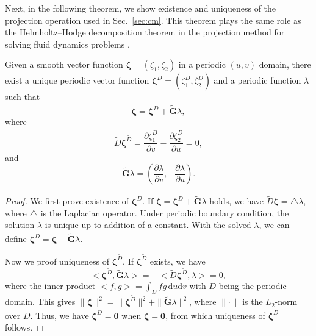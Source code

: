 Next, in the following theorem, we show existence and uniqueness of the projection operation used in Sec.~\ref{sec:cm}. This theorem plays the same role as the Helmholtz–Hodge decomposition theorem in  the projection method for solving fluid dynamics problems \cite{chorin1990mathematical}.

\begin{theorem}
Given a smooth vector function $\bm{\zeta}=(\zeta_1,\zeta_2)$ in a periodic $(u,v)$ domain, there exist a unique periodic vector function $\bm{\zeta}^{\tilde{ D}}=(\zeta^{\tilde{ D}}_1,\zeta^{\tilde{ D}}_2)$ and a periodic function $\lambda$ such that
	\begin{equation}
	\bm{\zeta}=\bm{\zeta}^{\tilde { D}}+\tilde{\mathbf{G}}\lambda,
	\end{equation}
where
\begin{equation}\label{eqn:projectionproof1}
	\tilde{{D}}\bm{\zeta}^{\tilde { D}}=\frac{\partial \zeta^{\tilde { D}}_1}{\partial v}-\frac{\partial \zeta^{\tilde { D}}_2}{\partial u}=0,
	\end{equation}
and
	\begin{equation}
	\tilde{\mathbf{G}}\lambda=\left(\frac{\partial \lambda}{\partial v},-\frac{\partial \lambda}{\partial u} \right).
	\end{equation}	
\end{theorem}

\begin{proof}	
	We first prove existence of $ \bm{\zeta}^{\tilde { D}} $. If $ \bm{\zeta}=\bm{\zeta}^{\tilde { D}}+\tilde{\mathbf{G}}\lambda$ holds, we have $\tilde { D} \bm{\zeta}= \bigtriangleup \lambda$, where $\bigtriangleup$ is the Laplacian operator. Under periodic boundary condition, the solution $\lambda$ is unique up to addition of a constant. With the solved $\lambda$, we can define $\bm{\zeta}^{\tilde { D}}=\bm{\zeta}-\tilde{\mathbf{G}}\lambda $.	

	Now we proof uniqueness of $ \bm{\zeta}^{\tilde { D}} $.  If $ \bm{\zeta}^{\tilde { D}} $ exists,
  we have
  \begin{equation*}
  <\bm{\zeta}^{\tilde { D}}, \tilde{\mathbf{G}}\lambda >=-<\tilde { D}\bm{\zeta}^{\tilde { D}}, \lambda > =0,
  \end{equation*}
  where the inner product $<f,g>=\int_D fg \, \mathrm{d}u \mathrm{d}v$ with $D$ being the periodic domain.
  This gives $\|\bm{\zeta}\|^2= \|\bm{\zeta}^{\tilde { D}}\|^2+\|\tilde{\mathbf{G}}\lambda\|^2$, where $\|\cdot\|$ is the $L_2$-norm over $D$. Thus, we have $\bm{\zeta}^{\tilde { D}}=\mathbf 0 $ when $\bm{\zeta}=\mathbf 0 $, from which  uniqueness of $ \bm{\zeta}^{\tilde { D}} $ follows.
\end{proof}

